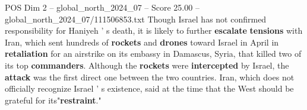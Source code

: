\begin{textsample}{POS Dim 2 – global\_north\_2024\_07 – Score 25.00 – global\_north\_2024\_07/111506853.txt}
Though Israel has not confirmed responsibility for Haniyeh ' s death, it is likely to further \textbf{escalate} \textbf{tensions} with Iran, which sent hundreds of \textbf{rockets} and \textbf{drones} toward Israel in April in \textbf{retaliation} for an airstrike on its embassy in Damascus, Syria, that killed two of its top \textbf{commanders}.
Although the \textbf{rockets} were \textbf{intercepted} by Israel, the \textbf{attack} was the first direct one between the two countries.
Iran, which does not officially recognize Israel ' s existence, said at the time that the West should be grateful for its"\textbf{restraint}."

\end{textsample}
